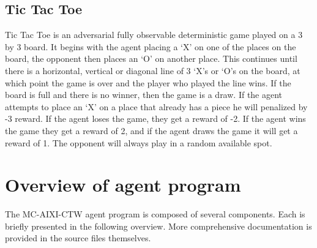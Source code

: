 \documentclass{article}
\theoremstyle{definition}
\newtheorem{primary statistics}[definition]{Primary Statistics}
\newtheorem{auxiliary statistics}[definition]{Auxiliary Statistics}
\begin{document}
\subsection{Tic Tac Toe}
Tic Tac Toe is an adversarial fully observable deterministic game played on a 3 by 3 board. It begins with the agent placing a ‘X’ on one of the places on the board, the opponent then places an ‘O’ on another place. This continues until there is a horizontal, vertical or diagonal line of 3 ‘X’s or ‘O’s on the board, at which point the game is over and the player who played the line wins. If the board is full and there is no winner, then the game is a draw. If the agent attempts to place an ‘X’ on a place that already has a piece he will penalized by -3 reward. If the agent loses the game, they get a reward of -2. If the agent wins the game they get a reward of 2, and if the agent draws the game it will get a reward of 1. The opponent will always play in a random available spot.


\section{Overview of agent program}

The MC-AIXI-CTW agent program is composed of several components. Each is briefly presented in the following overview. More comprehensive documentation is provided in the source files themselves.





\end{document}
